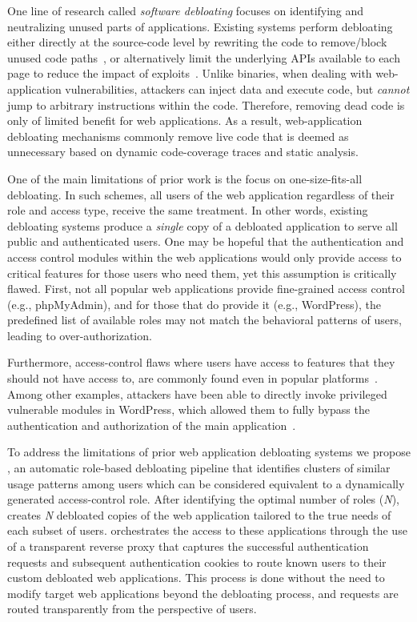 One line of research called \emph{software debloating} focuses on identifying and neutralizing unused parts of applications. 
Existing systems perform debloating either directly at the source-code level by rewriting the code to remove/block unused code paths~\cite{lessismore, mininode}, or alternatively 
limit the underlying APIs available to each page to reduce the impact of exploits~\cite{saphire}. 
Unlike binaries, when dealing with web-application vulnerabilities, attackers can inject data and execute code, but \emph{cannot} jump to arbitrary instructions within the code. 
Therefore, removing dead code is only of limited benefit for web applications. 
As a result, web-application debloating mechanisms commonly remove live code that is deemed as unnecessary based on dynamic code-coverage traces and static analysis. 

One of the main limitations of prior work is the focus on one-size-fits-all debloating. 
In such schemes, all users of the web application regardless of their role and access type, receive the same treatment. 
In other words, existing debloating systems produce a \emph{single} copy of a debloated application to serve all public and authenticated users. 
One may be hopeful that the authentication and access control modules within the web applications would only provide access to critical features for those users who need them, yet
this assumption is critically flawed. 
First, not all popular web applications provide fine-grained access control (e.g., phpMyAdmin), and for those that do provide it (e.g., WordPress), the predefined list of available roles may not match the behavioral patterns of users, leading to over-authorization. 

Furthermore, access-control flaws where users have access to features that they should not have access to, are commonly found even in popular platforms~\cite{dalton2009nemesis,doupe2011fear}. 
Among other examples, attackers have been able to directly invoke privileged vulnerable modules in WordPress, which allowed them to fully bypass the authentication and authorization of the main application~\cite{wpfilemanager}. 

To address the limitations of prior web application debloating systems
we propose \dbltr{}, an automatic role-based debloating pipeline that identifies clusters of similar usage patterns among users which can be considered equivalent to a dynamically generated access-control role. 
After identifying the optimal number of roles (\emph{N}), \dbltr{} creates \emph{N} debloated copies of the web application tailored to the true needs of each subset of users. \dbltr{} orchestrates the access to these applications through the use of a transparent reverse proxy that captures the successful authentication requests and subsequent authentication cookies to route known users to their custom debloated web applications. 
This process is done without the need to modify target web applications beyond the debloating process, and requests are routed transparently from the perspective of users.


